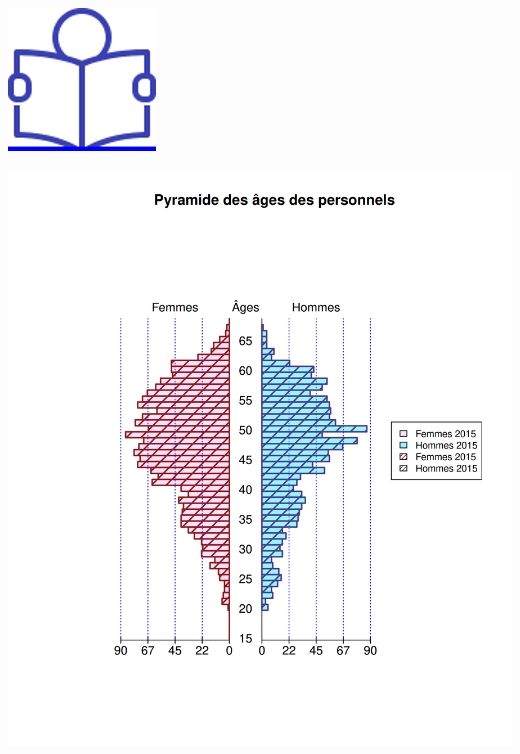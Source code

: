 \href{../Docs/Notices/fiche_2.odt}{\includegraphics{icones/Notice.png}}

\includegraphics{altair_files/figure-latex/unnamed-chunk-11-1.png}
